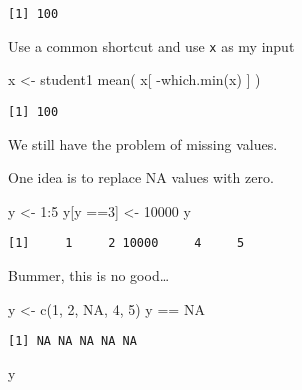 \documentclass[
  letterpaper,
  DIV=11,
  numbers=noendperiod]{scrartcl}
\newenvironment{Shaded}{\begin{snugshade}}{\end{snugshade}}
\newcommand{\ConstantTok}[1]{\textcolor[rgb]{0.56,0.35,0.01}{#1}}
\newcommand{\DecValTok}[1]{\textcolor[rgb]{0.68,0.00,0.00}{#1}}
\newcommand{\FunctionTok}[1]{\textcolor[rgb]{0.28,0.35,0.67}{#1}}
\newcommand{\NormalTok}[1]{\textcolor[rgb]{0.00,0.23,0.31}{#1}}
\newcommand{\OtherTok}[1]{\textcolor[rgb]{0.00,0.23,0.31}{#1}}
\newcommand{\SpecialCharTok}[1]{\textcolor[rgb]{0.37,0.37,0.37}{#1}}
\begin{document}
\begin{verbatim}
[1] 100
\end{verbatim}

Use a common shortcut and use \texttt{x} as my input

\begin{Shaded}
\begin{Highlighting}[]
\NormalTok{x }\OtherTok{\textless{}{-}}\NormalTok{ student1}
\FunctionTok{mean}\NormalTok{( x[ }\SpecialCharTok{{-}}\FunctionTok{which.min}\NormalTok{(x) ] )}
\end{Highlighting}
\end{Shaded}

\begin{verbatim}
[1] 100
\end{verbatim}

We still have the problem of missing values.

One idea is to replace NA values with zero.

\begin{Shaded}
\begin{Highlighting}[]
\NormalTok{y }\OtherTok{\textless{}{-}} \DecValTok{1}\SpecialCharTok{:}\DecValTok{5}
\NormalTok{y[y }\SpecialCharTok{==}\DecValTok{3}\NormalTok{] }\OtherTok{\textless{}{-}} \DecValTok{10000}
\NormalTok{y}
\end{Highlighting}
\end{Shaded}

\begin{verbatim}
[1]     1     2 10000     4     5
\end{verbatim}

Bummer, this is no good\ldots{}

\begin{Shaded}
\begin{Highlighting}[]
\NormalTok{y }\OtherTok{\textless{}{-}} \FunctionTok{c}\NormalTok{(}\DecValTok{1}\NormalTok{, }\DecValTok{2}\NormalTok{, }\ConstantTok{NA}\NormalTok{, }\DecValTok{4}\NormalTok{, }\DecValTok{5}\NormalTok{)}
\NormalTok{y }\SpecialCharTok{==} \ConstantTok{NA}
\end{Highlighting}
\end{Shaded}

\begin{verbatim}
[1] NA NA NA NA NA
\end{verbatim}

\begin{Shaded}
\begin{Highlighting}[]
\NormalTok{y}
\end{Highlighting}
\end{Shaded}
\end{document}
